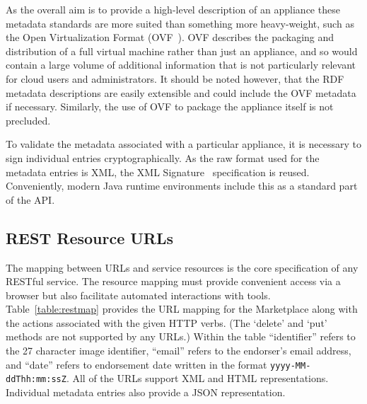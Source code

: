 As the overall aim is to provide a high-level description of an
appliance these metadata standards are more suited than something more
heavy-weight, such as the Open Virtualization Format
(OVF~\cite{ovf}). OVF describes the packaging and distribution of a
full virtual machine rather than just an appliance, and so would
contain a large volume of additional information that is not
particularly relevant for cloud users and administrators. It should be
noted however, that the RDF metadata descriptions are easily
extensible and could include the OVF metadata if necessary.
Similarly, the use of OVF to package the appliance itself is not
precluded.

To validate the metadata associated with a particular appliance, it is
necessary to sign individual entries cryptographically.  As the raw
format used for the metadata entries is XML, the XML
Signature~\cite{xmlsig} specification is reused.  Conveniently, modern
Java runtime environments include this as a standard part of the
API\@.

\subsection{REST Resource URLs}

The mapping between URLs and service resources is the core
specification of any RESTful service.  The resource mapping must
provide convenient access via a browser but also facilitate automated
interactions with tools.  Table~\ref{table:restmap} provides the URL
mapping for the Marketplace along with the actions associated with the
given HTTP verbs.  (The `delete' and `put' methods are not supported
by any URLs.)  Within the table ``identifier'' refers to the 27
character image identifier, ``email'' refers to the endorser's email
address, and ``date'' refers to endorsement date written in the format
{\tt yyyy-MM-ddThh:mm:ssZ}.  All of the URLs support XML and HTML
representations.  Individual metadata entries also provide a JSON
representation.

